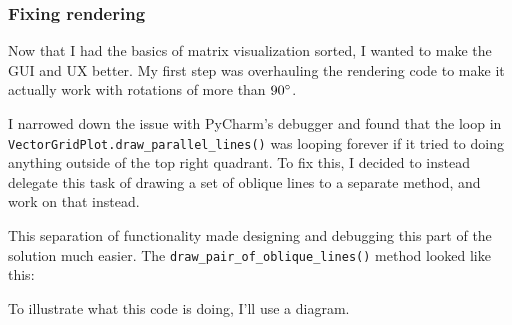 \documentclass[../development.tex]{subfiles}
\begin{document}
\subsubsection{Fixing rendering\label{development:improving-the-gui:fixing-rendering}}

Now that I had the basics of matrix visualization sorted, I wanted to make the GUI and UX better. My first step was overhauling the rendering code to make it actually work with rotations of more than $90\degree$.

I narrowed down the issue with PyCharm's debugger and found that the loop in \texttt{VectorGridPlot.draw\_parallel\_lines()} was looping forever if it tried to doing anything outside of the top right quadrant. To fix this, I decided to instead delegate this task of drawing a set of oblique lines to a separate method, and work on that instead.


This separation of functionality made designing and debugging this part of the solution much easier. The \texttt{draw\_pair\_of\_oblique\_lines()} method looked like this:


To illustrate what this code is doing, I'll use a diagram.
\end{document}
